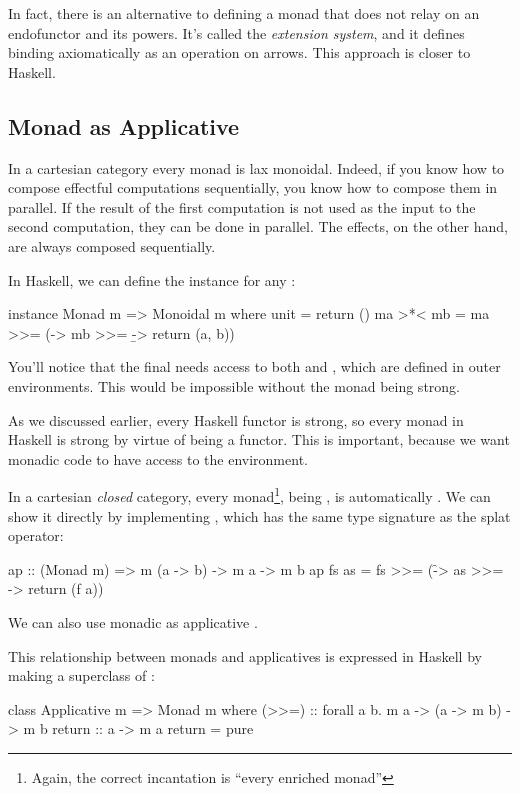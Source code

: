 \documentclass[DaoFP]{subfiles}
\begin{document}
In fact, there is an alternative to defining a monad that does not relay on an endofunctor and its powers. It's called the \emph{extension system}, and it  defines binding axiomatically as an operation on arrows. This approach is closer to Haskell.

\subsection{Monad as Applicative}

In a cartesian category every monad is lax monoidal. Indeed, if you know how to compose effectful computations sequentially, you know how to compose them in parallel. If the result of the first computation is not used as the input to the second computation, they can be done in parallel. The effects, on the other hand, are always composed sequentially. 

In Haskell, we can define the  instance for any :
\begin{haskell}
instance Monad m => Monoidal m where
    unit = return ()
    ma >*< mb = ma >>= 
         (\a -> mb >>= 
             \b -> return (a, b))
\end{haskell}
You'll notice that the final  needs access to both  and , which are defined in outer environments. This would be impossible without the monad being strong.

As we discussed earlier, every Haskell functor is strong, so every monad in Haskell is strong by virtue of being a functor. This is important, because we want monadic code to have access to the environment. 


In a cartesian \emph{closed} category, every monad\footnote{Again, the correct incantation is ``every enriched monad''}, being , is automatically . We can show it directly by implementing , which has the same type signature as the splat operator:
\begin{haskell}
ap :: (Monad m) => m (a -> b) -> m a -> m b
ap fs as = fs >>= 
    (\f -> as >>= 
        \a -> return (f a))
\end{haskell}
We can also use monadic  as applicative .

This relationship between monads and applicatives is expressed in Haskell by making  a superclass of :
\begin{haskell}
class Applicative m => Monad m where
    (>>=)       :: forall a b. m a -> (a -> m b) -> m b
    return      :: a -> m a
    return      = pure
\end{haskell}
\end{document}
